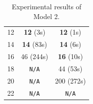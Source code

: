 \begin{table}[h]
\begin{minipage}[t]{0.42\textwidth}
\begin{tabular}{c|c|c}
12  & \textbf{12} (3s)     & \textbf{12} (1s) \\
14  & \textbf{14} (83s)    & \textbf{14} (6s) \\
16  & 46 (244s)            & \textbf{16} (10s) \\
18  & \texttt{N/A}         & 44 (53s) \\
20  & \texttt{N/A}         & 200 (272s) \\
22  & \texttt{N/A}         & \texttt{N/A} \\
\hline
\end{tabular}
\caption{Experimental results of Model 2.}
\label{tab:results_sat_m2}
\end{minipage}
\end{table}

